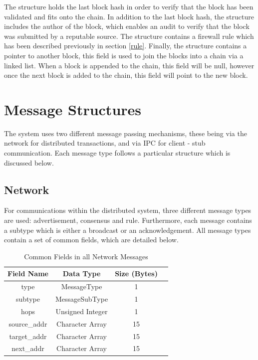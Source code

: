\documentclass[a4paper, 11pt]{report}
\begin{document}
The structure holds the last block hash in order to verify that the block has been validated and fits onto the chain. In addition to the last block hash, the structure includes the author of the block, which enables an audit to verify that the block was submitted by a reputable source. The structure contains a firewall rule which has been described previously in section \ref{rule}. Finally, the structure contains a pointer to another block, this field is used to join the blocks into a chain via a linked list. When a block is appended to the chain, this field will be null, however once the next block is added to the chain, this field will point to the new block.

\section{Message Structures}
The system uses two different message passing mechanisms, these being via the network for distributed transactions, and via \acrshort{IPC} for client - stub communication. Each message type follows a particular structure which is discussed below.

\subsection{Network}
For communications within the distributed system, three different message types are used: advertisement, consensus and rule. Furthermore, each message contains a subtype which is either a broadcast or an acknowledgement. All message types contain a set of common fields, which are detailed below.

\begin{table}[H]
\centering
\begin{tabular}{ |c|c|c|c| } 
\hline
Field Name & Data Type & Size (Bytes) \\
\hline
type & MessageType & 1 \\ 
subtype & MessageSubType & 1 \\ 
hops & Unsigned Integer & 1 \\ 
source_addr & Character Array & 15 \\
target_addr & Character Array & 15 \\
next_addr & Character Array & 15 \\
\hline
\end{tabular}
\caption{Common Fields in all Network Messages}
\label{tab:common}
\end{table}
\end{document}
